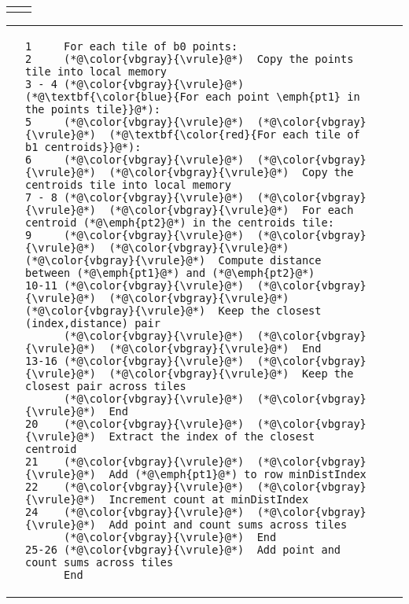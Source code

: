 \vspace{-0.2in}\begin{tabular}{cc}
{\parbox{0.45\textwidth}{}} &
{\parbox{0.5\textwidth}{}}
\end{tabular}

\hspace{-0.180\textwidth}
\centering\begin{tabular}{cm{}m{}m{}}
{} &
{\begin{lstlisting}[numbers=none,language=PseudoSimple]
1     For each tile of b0 points:
2     (*@\color{vbgray}{\vrule}@*)  Copy the points tile into local memory
3 - 4 (*@\color{vbgray}{\vrule}@*)  (*@\textbf{\color{blue}{For each point \emph{pt1} in the points tile}}@*):
5     (*@\color{vbgray}{\vrule}@*)  (*@\color{vbgray}{\vrule}@*)  (*@\textbf{\color{red}{For each tile of b1 centroids}}@*):
6     (*@\color{vbgray}{\vrule}@*)  (*@\color{vbgray}{\vrule}@*)  (*@\color{vbgray}{\vrule}@*)  Copy the centroids tile into local memory
7 - 8 (*@\color{vbgray}{\vrule}@*)  (*@\color{vbgray}{\vrule}@*)  (*@\color{vbgray}{\vrule}@*)  For each centroid (*@\emph{pt2}@*) in the centroids tile:
9     (*@\color{vbgray}{\vrule}@*)  (*@\color{vbgray}{\vrule}@*)  (*@\color{vbgray}{\vrule}@*)  (*@\color{vbgray}{\vrule}@*)  Compute distance between (*@\emph{pt1}@*) and (*@\emph{pt2}@*)
10-11 (*@\color{vbgray}{\vrule}@*)  (*@\color{vbgray}{\vrule}@*)  (*@\color{vbgray}{\vrule}@*)  (*@\color{vbgray}{\vrule}@*)  Keep the closest (index,distance) pair
      (*@\color{vbgray}{\vrule}@*)  (*@\color{vbgray}{\vrule}@*)  (*@\color{vbgray}{\vrule}@*)  End
13-16 (*@\color{vbgray}{\vrule}@*)  (*@\color{vbgray}{\vrule}@*)  (*@\color{vbgray}{\vrule}@*)  Keep the closest pair across tiles
      (*@\color{vbgray}{\vrule}@*)  (*@\color{vbgray}{\vrule}@*)  End
20    (*@\color{vbgray}{\vrule}@*)  (*@\color{vbgray}{\vrule}@*)  Extract the index of the closest centroid
21    (*@\color{vbgray}{\vrule}@*)  (*@\color{vbgray}{\vrule}@*)  Add (*@\emph{pt1}@*) to row minDistIndex
22    (*@\color{vbgray}{\vrule}@*)  (*@\color{vbgray}{\vrule}@*)  Increment count at minDistIndex
24    (*@\color{vbgray}{\vrule}@*)  (*@\color{vbgray}{\vrule}@*)  Add point and count sums across tiles
      (*@\color{vbgray}{\vrule}@*)  End
25-26 (*@\color{vbgray}{\vrule}@*)  Add point and count sums across tiles
      End
\end{lstlisting}} & \hfill &

\end{tabular}

